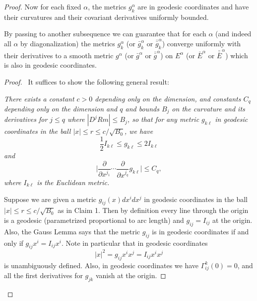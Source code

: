 \begin{proof}
Now for each fixed $\alpha$, the metrics $g_k^{\alpha}$ are in
geodesic coordinates and have their curvatures and their covariant
derivatives uniformly bounded.

\begin{proposition}
  \label{prop:cz-local-metric-subsequence-convergence}
By passing to another subsequence we
can guarantee that for each $\alpha$ (and indeed all $\alpha$ by
diagonalization) the metrics $g_k^{\alpha}$ (or $\bar
g_k^{\alpha}$ or ${\bar{\bar g}}_k^{\alpha}$) converge uniformly
with their derivatives to a smooth metric $g^{\alpha}$ (or $\bar
g^{\alpha}$ or ${\bar{\bar g}}^{\alpha}$) on $E^{\alpha}$ (or
$\bar E^{\alpha}$ or ${\bar{\bar E}}^{\alpha}$) which is also in
geodesic coordinates.
\end{proposition}
\begin{proof}
\ It suffices to show the
following general result:

\medskip
{\it There exists a constant $c>0$ depending only on the
dimension, and constants $C_q$ depending only on the dimension and
$q$ and bounds $B_j$ on the curvature and its derivatives for $j
\leq q$ where $|D^jRm| \leq B_j$, so that for any metric $g_{k
\ell}$ in geodesic coordinates in the ball $|x| \leq r \leq c/
\sqrt{B_0}$, we have
$$
\frac{1}{2} I_{k \ell} \leq g_{k \ell} \leq 2I_{k \ell}
$$
and
$$
\Big| \frac{\partial}{\partial x^{j_1}} \cdots
\frac{\partial}{\partial x^{j_q}} g_{k \ell} \Big| \leq C_q,
$$
where $I_{k\ell}$ is the Euclidean metric.}

\medskip
Suppose we are given a metric $g_{ij}(x)dx^idx^j$ in geodesic
coordinates in the ball $|x| \leq r \leq c/ \sqrt{B_0}$ as in
Claim 1. Then by definition every line through the origin is a
geodesic (parametrized proportional to arc length) and
$g_{ij}=I_{ij}$ at the origin. Also, the Gauss Lemma says that the
metric $g_{ij}$ is in geodesic coordinates if and only if
$g_{ij}x^i=I_{ij}x^i$. Note in particular that in geodesic
coordinates
$$
|x|^2=g_{ij}x^ix^j=I_{ij}x^ix^j
$$
is unambiguously defined. Also, in geodesic coordinates we have
$\Gamma^k_{ij}(0)=0$, and all the first derivatives for $g_{jk}$
vanish at the origin.


\end{proof}
\end{proof}
